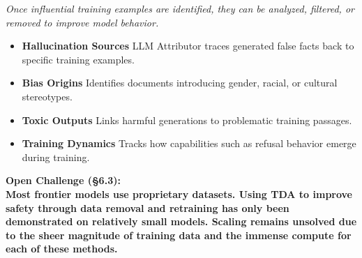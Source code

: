 \begin{frame}

{\scriptsize\itshape
Once influential training examples are identified, they can be analyzed,
filtered, or removed to improve model behavior.
}

\vspace{0.2em}

{\footnotesize\bfseries{}}

\begin{itemize}
\scriptsize
\setlength\itemsep{4pt}

\item \textbf{Hallucination Sources}
      LLM Attributor traces generated false facts back to specific
      training examples.

\item \textbf{Bias Origins}
      Identifies documents introducing gender, racial, or cultural
      stereotypes.

\item \textbf{Toxic Outputs}
      Links harmful generations to problematic training passages.

\item \textbf{Training Dynamics}
      Tracks how capabilities such as refusal behavior emerge during
      training.
\end{itemize}

\vspace{0.3em}

\begin{ucrwarn}
\scriptsize\bfseries Open Challenge (\S6.3):\\[2pt]

\scriptsize
Most frontier models use proprietary datasets.
Using TDA to improve safety through data removal and retraining has only
been demonstrated on relatively small models. Scaling remains unsolved due to the sheer magnitude of training data and the immense compute for each of these methods.
\end{ucrwarn}

\end{frame}


